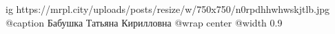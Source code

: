  
 
 
 
 

\ifcmt
  ig https://mrpl.city/uploads/posts/resize/w/750x750/n0rpdhhwhwskjtlb.jpg
	@caption Бабушка Татьяна Кирилловна
  @wrap center
  @width 0.9
\fi
